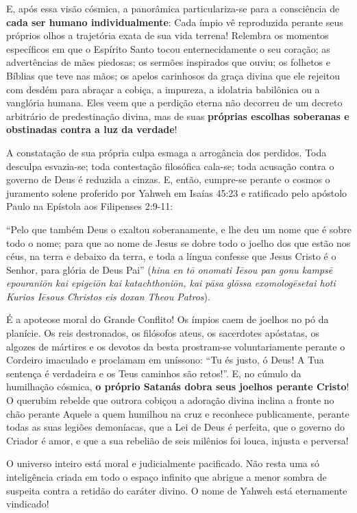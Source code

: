 \documentclass[11pt,a4paper,openany]{book}
\begin{document}
E, após essa visão cósmica, a panorâmica particulariza-se para a consciência de \textbf{cada ser humano individualmente}:
Cada ímpio vê reproduzida perante seus próprios olhos a trajetória exata de sua vida terrena! Relembra os momentos específicos em que o Espírito Santo tocou enternecidamente o seu coração; as advertências de mães piedosas; os sermões inspirados que ouviu; os folhetos e Bíblias que teve nas mãos; os apelos carinhosos da graça divina que ele rejeitou com desdém para abraçar a cobiça, a impureza, a idolatria babilônica ou a vanglória humana.
Eles veem que a perdição eterna não decorreu de um decreto arbitrário de predestinação divina, mas de suas \textbf{próprias escolhas soberanas e obstinadas contra a luz da verdade}!

A constatação de sua própria culpa esmaga a arrogância dos perdidos. Toda desculpa esvazia-se; toda contestação filosófica cala-se; toda acusação contra o governo de Deus é reduzida a cinzas.
E, então, cumpre-se perante o cosmos o juramento solene proferido por Yahweh em Isaías 45:23 e ratificado pelo apóstolo Paulo na Epístola aos Filipenses 2:9-11:

``Pelo que também Deus o exaltou soberanamente, e lhe deu um nome que é sobre todo o nome; para que ao nome de Jesus se dobre todo o joelho dos que estão nos céus, na terra e debaixo da terra, e toda a língua confesse que Jesus Cristo é o Senhor, para glória de Deus Pai'' (\textit{hina en tō onomati Iēsou pan gonu kampsē epouraniōn kai epigeiōn kai katachthoniōn, kai pāsa glōssa exomologēsetai hoti Kurios Iēsous Christos eis doxan Theou Patros}).

É a apoteose moral do Grande Conflito!
Os ímpios caem de joelhos no pó da planície. Os reis destronados, os filósofos ateus, os sacerdotes apóstatas, os algozes de mártires e os devotos da besta prostram-se voluntariamente perante o Cordeiro imaculado e proclamam em uníssono: ``Tu és justo, ó Deus! A Tua sentença é verdadeira e os Teus caminhos são retos!''.
E, no cúmulo da humilhação cósmica, \textbf{o próprio Satanás dobra seus joelhos perante Cristo}! O querubim rebelde que outrora cobiçou a adoração divina inclina a fronte no chão perante Aquele a quem humilhou na cruz e reconhece publicamente, perante todas as suas legiões demoníacas, que a Lei de Deus é perfeita, que o governo do Criador é amor, e que a sua rebelião de seis milênios foi louca, injusta e perversa!

O universo inteiro está moral e judicialmente pacificado. Não resta uma só inteligência criada em todo o espaço infinito que abrigue a menor sombra de suspeita contra a retidão do caráter divino. O nome de Yahweh está eternamente vindicado!
\end{document}
